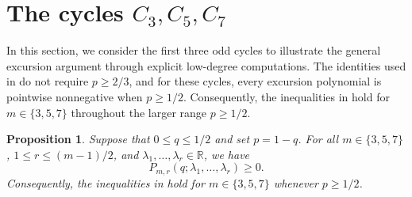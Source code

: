\documentclass[11pt]{article}
\newtheorem{proposition}[theorem]{Proposition}
\numberwithin{equation}{section}
\newcommand{\R}{\mathbb R}
\begin{document}
\section{The cycles \texorpdfstring{$C_3,C_5,C_7$}{C3, C5, C7}}
\label{sec:short-cycles}

In this section, we consider the first three odd cycles to illustrate the
general excursion argument through explicit low-degree computations. The
identities used in  do not require
$p\ge2/3$, and for these cycles, every excursion polynomial is pointwise
nonnegative when $p\ge1/2$. Consequently, the inequalities in
 hold for $m\in\{3,5,7\}$ throughout the
larger range $p\ge1/2$.

\begin{proposition}\label{prop:short-cycles}
  Suppose that $0\le q\le1/2$ and set $p=1-q$. For all $m\in\{3,5,7\}$,
  $1\le r\le(m-1)/2$, and $\lambda_1,\ldots,\lambda_r\in\R$, we have
  \[
    P_{m,r}(q;\lambda_1,\ldots,\lambda_r)\ge0.
  \]
  Consequently, the inequalities in  hold
  for $m\in\{3,5,7\}$ whenever $p\ge1/2$.
\end{proposition}
\end{document}
